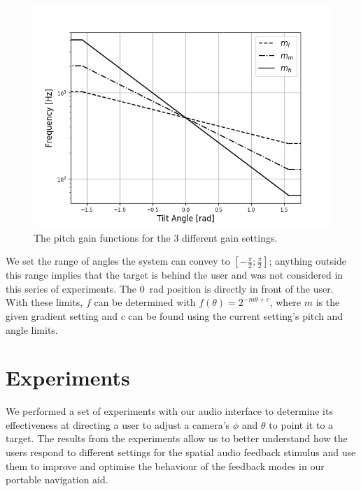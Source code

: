 \documentclass[sigconf, screen=true, anonymous=true]{acmart}
\begin{document}
\begin{figure}
  \centering
  \includegraphics[width=1.0\columnwidth]{figures/pitch_gain_functions.png}
  \caption{The pitch gain functions for the 3 different gain settings. }\label{fig:pitch-gain}
\end{figure}

We set the range of angles the system can convey to $[-\frac{\pi}{2}; \frac{\pi}{2}]$; anything outside this range implies that the target is behind the user and was not considered in this series of experiments. 
The \SI{0}{\radian} position is directly in front of the user.
With these limits, $f$ can be determined with $f(\theta) = 2^{-m\theta + c}$, where $m$ is the given gradient setting and $c$ can be found using the current setting's pitch and angle limits.

\section{Experiments}\label{sec:experiments}

We performed a set of experiments with our audio interface to determine its effectiveness at directing a user to adjust a camera's $\phi$ and $\theta$ to point it to a target.
The results from the experiments allow us to better understand how the users respond to different settings for the spatial audio feedback stimulus and use them to improve and optimise the behaviour of the feedback modes in our portable navigation aid.
\end{document}
